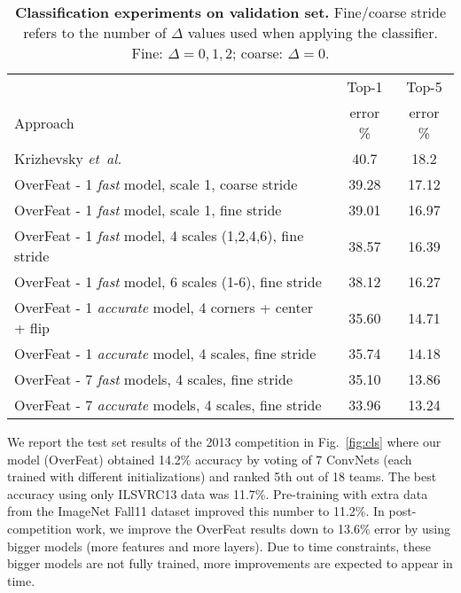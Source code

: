 \documentclass{article} %
\newcommand{\fig}[1]{Fig.~\ref{fig:#1}}
\def\etal{{\textit{et~al.~}}}
\begin{document}

\begin{table}[h!]
\small
\begin{center}
\begin{tabular}{|l||c|c|}
  \hline  
           & Top-1    & Top-5  \\
  Approach & error \% & error \%\\ \hline
  \hline
  Krizhevsky \etal \cite{Kriz12}                             & 40.7 & 18.2 \\ \hline \hline
  OverFeat - 1 {\em fast} model, scale 1, coarse stride            & 39.28 & 17.12 \\ \hline 
  OverFeat - 1 {\em fast} model, scale 1, fine stride              & 39.01 & 16.97   \\ \hline 
  OverFeat - 1 {\em fast} model, 4 scales (1,2,4,6), fine stride   & 38.57 & 16.39 \\ \hline
  OverFeat - 1 {\em fast} model, 6 scales (1-6), fine stride       & 38.12 & 16.27 \\ \hline
  OverFeat - 1 {\em accurate} model, 4 corners + center + flip          & 35.60 & 14.71 \\ \hline
  OverFeat - 1 {\em accurate} model, 4 scales, fine stride              & 35.74 & 14.18 \\ \hline
  OverFeat - 7 {\em fast} models, 4 scales, fine stride            & 35.10 & 13.86 \\ \hline
  OverFeat - 7 {\em accurate} models, 4 scales, fine stride             & 33.96 & 13.24 \\ \hline
\end{tabular}
\vspace*{2mm}
\caption{\textbf{Classification experiments on validation set.}
  Fine/coarse stride refers
  to the number of $\Delta$ values used when applying the
  classifier. Fine: $\Delta={0,1,2}$; coarse: $\Delta=0$. }
\label{tab:clsval}
\end{center}
\end{table}

We report the test set results of the 2013 competition in \fig{cls}
where our model (OverFeat) obtained 14.2\% accuracy by voting of 7 ConvNets
(each trained with different initializations) and ranked 5th out of 18 teams.
The best accuracy using only ILSVRC13 data was
11.7\%. Pre-training with extra data from the ImageNet Fall11 dataset improved
this number to 11.2\%. In post-competition work, we improve the OverFeat results down
to 13.6\% error by using bigger models (more features and more layers).
Due to time constraints, these bigger models are not fully trained, more improvements
are expected to appear in time.
\end{document}
